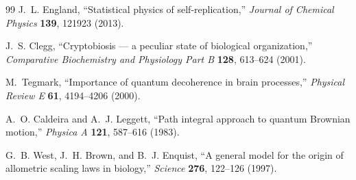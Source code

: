 \documentclass[11pt,a4paper]{article}
\begin{document}
\begin{thebibliography}{99}
J.~L. England, ``Statistical physics of self-replication,'' \emph{Journal of Chemical Physics} \textbf{139}, 121923 (2013).

J.~S. Clegg, ``Cryptobiosis --- a peculiar state of biological organization,'' \emph{Comparative Biochemistry and Physiology Part B} \textbf{128}, 613--624 (2001).

M.~Tegmark, ``Importance of quantum decoherence in brain processes,'' \emph{Physical Review E} \textbf{61}, 4194--4206 (2000).

A.~O. Caldeira and A.~J. Leggett, ``Path integral approach to quantum Brownian motion,'' \emph{Physica A} \textbf{121}, 587--616 (1983).

G.~B. West, J.~H. Brown, and B.~J. Enquist, ``A general model for the origin of allometric scaling laws in biology,'' \emph{Science} \textbf{276}, 122--126 (1997).

\end{thebibliography}
\end{document}
